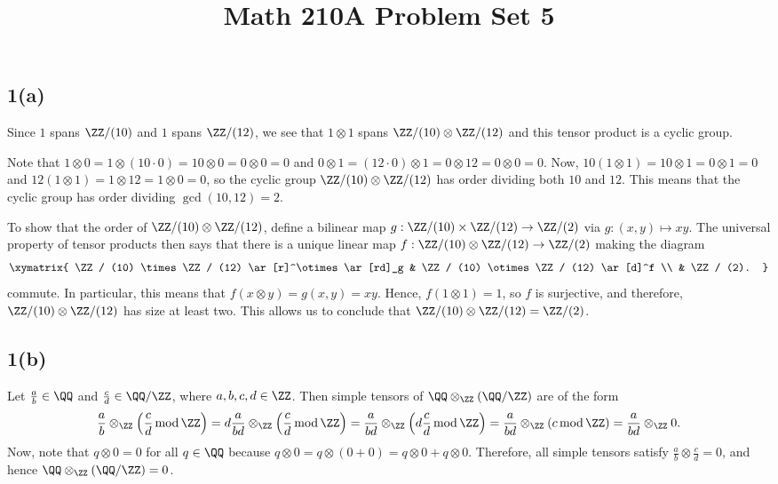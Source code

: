 \documentclass[12pt, reqno]{amsart}
\begin{document}
\title{Math 210A Problem Set 5}


\subsection*{1(a)}

Since $1$ spans $\ZZ / (10)$ and $1$ spans $\ZZ / (12)$, 
we see that $1 \otimes 1$ spans $\ZZ / (10) \otimes \ZZ / (12)$ and this tensor
product is a cyclic group. 

Note that 
$1 \otimes 0 = 1 \otimes (10 \cdot 0) = 10 \otimes 0 = 0 \otimes 0 = 0$
and 
$0 \otimes 1 = (12 \cdot 0) \otimes 1 = 0 \otimes 12 = 0 \otimes 0 = 0$.
Now,
$10 (1 \otimes 1) = 10 \otimes 1 = 0 \otimes 1 = 0$
and 
$12 (1 \otimes 1) = 1 \otimes 12 = 1 \otimes 0 = 0$,
so the cyclic group $\ZZ / (10) \otimes \ZZ / (12)$ has order dividing both
$10$ and $12$. This means that the cyclic group has order dividing 
$\gcd(10, 12) = 2$.

To show that the order of $\ZZ / (10) \otimes \ZZ / (12)$, define a bilinear map
$g: \ZZ / (10) \times \ZZ / (12) \to \ZZ / (2)$ via
$g : (x, y) \mapsto xy$. The universal property of tensor products then
says that there is a unique linear map 
$f: \ZZ / (10) \otimes \ZZ / (12) \to \ZZ / (2)$ making the diagram
\[ 
\xymatrix{
\ZZ / (10) \times \ZZ / (12) \ar[r]^\otimes \ar[rd]_g
	& \ZZ / (10) \otimes \ZZ / (12) \ar[d]^f \\
& \ZZ / (2).
}
\] 
commute. In particular, this means that $f (x \otimes y) = g(x, y) = xy$.
Hence, $f(1 \otimes 1) = 1$, so $f$ is surjective, and therefore, 
$\ZZ / (10) \otimes \ZZ / (12)$ has size at least two. This allows us to
conclude that $\ZZ / (10) \otimes \ZZ / (12) = \ZZ / (2)$.


\subsection*{1(b)}

\def\mod{\operatorname{mod}}

Let $\frac ab \in \QQ$ and $\frac cd \in \QQ/\ZZ$, where $a, b, c, d \in \ZZ$.
Then simple tensors of $\QQ
\otimes_\ZZ (\QQ / \ZZ)$ are of the form
\[ 
\frac ab \otimes_\ZZ \left( \frac cd \mod \ZZ \right) 
= d \frac a{bd} \otimes_\ZZ \left( \frac cd \mod \ZZ \right) 
= \frac a{bd} \otimes_\ZZ \left( d \frac cd \mod \ZZ \right) 
= \frac a{bd} \otimes_\ZZ \left( c \mod \ZZ \right) 
= \frac a{bd} \otimes_\ZZ 0.
\] 
Now, note that $q \otimes 0 = 0$ for all $q \in \QQ$ because
$q \otimes 0 = q \otimes (0+0) = q \otimes 0 + q \otimes 0$.
Therefore, all simple tensors satisfy $\frac ab \otimes \frac cd = 0$, 
and hence $\QQ \otimes_\ZZ (\QQ / \ZZ) = 0$.
\end{document}
